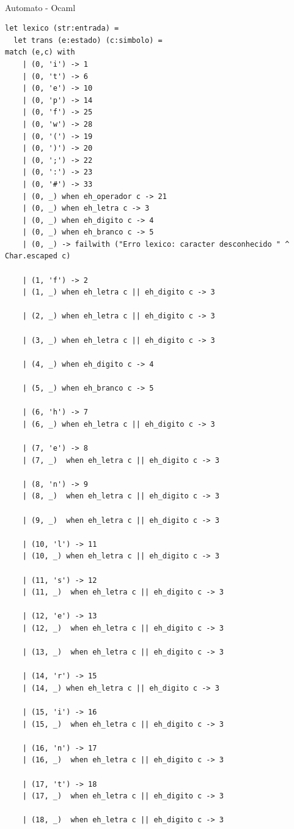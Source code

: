 \documentclass{article}
\begin{document}
\\Automato - Ocaml
\begin{lstlisting}
let lexico (str:entrada) = 
  let trans (e:estado) (c:simbolo) = 
match (e,c) with    
    | (0, 'i') -> 1
    | (0, 't') -> 6
    | (0, 'e') -> 10
    | (0, 'p') -> 14
    | (0, 'f') -> 25
    | (0, 'w') -> 28
    | (0, '(') -> 19
    | (0, ')') -> 20
    | (0, ';') -> 22
    | (0, ':') -> 23
    | (0, '#') -> 33
    | (0, _) when eh_operador c -> 21
    | (0, _) when eh_letra c -> 3
    | (0, _) when eh_digito c -> 4
    | (0, _) when eh_branco c -> 5 
    | (0, _) -> failwith ("Erro lexico: caracter desconhecido " ^ Char.escaped c)
    
    | (1, 'f') -> 2
    | (1, _) when eh_letra c || eh_digito c -> 3
    
    | (2, _) when eh_letra c || eh_digito c -> 3
    
    | (3, _) when eh_letra c || eh_digito c -> 3
    
    | (4, _) when eh_digito c -> 4
    
    | (5, _) when eh_branco c -> 5
    
    | (6, 'h') -> 7
    | (6, _) when eh_letra c || eh_digito c -> 3
   
    | (7, 'e') -> 8
    | (7, _)  when eh_letra c || eh_digito c -> 3
    
    | (8, 'n') -> 9  
    | (8, _)  when eh_letra c || eh_digito c -> 3

    | (9, _)  when eh_letra c || eh_digito c -> 3

    | (10, 'l') -> 11
    | (10, _) when eh_letra c || eh_digito c -> 3
    
    | (11, 's') -> 12
    | (11, _)  when eh_letra c || eh_digito c -> 3
    
    | (12, 'e') -> 13 
    | (12, _)  when eh_letra c || eh_digito c -> 3
    
    | (13, _)  when eh_letra c || eh_digito c -> 3

    | (14, 'r') -> 15
    | (14, _) when eh_letra c || eh_digito c -> 3
    
    | (15, 'i') -> 16
    | (15, _)  when eh_letra c || eh_digito c -> 3
    
    | (16, 'n') -> 17 
    | (16, _)  when eh_letra c || eh_digito c -> 3
    
    | (17, 't') -> 18
    | (17, _)  when eh_letra c || eh_digito c -> 3
    
    | (18, _)  when eh_letra c || eh_digito c -> 3


\end{lstlisting}
\end{document}
